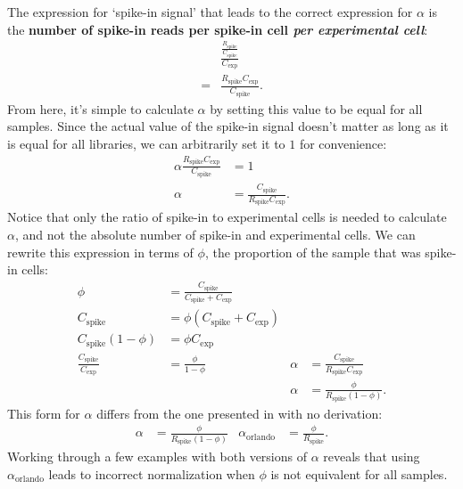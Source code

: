 The expression for `spike-in signal' that leads to the correct expression for $\alpha$ is the \textbf{number of spike-in reads per spike-in cell \textit{per experimental cell}}:
\begin{align*}
    & \frac{ \frac{R_\text{spike}}{C_\text{spike}}}{C_\text{exp}} \\
    = & \frac{R_\text{spike} C_\text{exp}}{C_\text{spike}}.
\end{align*}
From here, it's simple to calculate $\alpha$ by setting this value to be equal for all samples.
Since the actual value of the spike-in signal doesn't matter as long as it is equal for all libraries, we can arbitrarily set it to $1$ for convenience:
\begin{align*}
    \alpha \frac{R_\text{spike} C_\text{exp}}{C_\text{spike}} &= 1 \\
    \alpha &= \frac{C_\text{spike}}{R_\text{spike} C_\text{exp}}.
\end{align*}
Notice that only the ratio of spike-in to experimental cells is needed to calculate $\alpha$, and not the absolute number of spike-in and experimental cells.
We can rewrite this expression in terms of $\phi$, the proportion of the sample that was spike-in cells:
\begin{align*}
    \phi &= \frac{C_\text{spike}}{C_\text{spike} + C_\text{exp}} \\
    C_\text{spike} & = \phi \left(C_\text{spike} + C_\text{exp} \right) \\
    C_\text{spike} \left(1-\phi \right) & = \phi C_\text{exp} \\
    \frac{C_\text{spike}}{C_\text{exp}} & = \frac{\phi}{1-\phi} & \alpha &= \frac{C_\text{spike}}{R_\text{spike} C_\text{exp}} \\
                                        && \alpha &= \frac{\phi}{R_\text{spike} \left(1-\phi \right)}.
\end{align*}
This form for $\alpha$ differs from the one presented in \citet{orlando2014} with no derivation:
\begin{align*}
    \alpha &= \frac{\phi}{R_\text{spike} \left(1-\phi \right)} & \alpha_\text{orlando} &= \frac{\phi}{R_\text{spike}}.
\end{align*}
Working through a few examples with both versions of $\alpha$ reveals that using $\alpha_\text{orlando}$ leads to incorrect normalization when $\phi$ is not equivalent for all samples.

